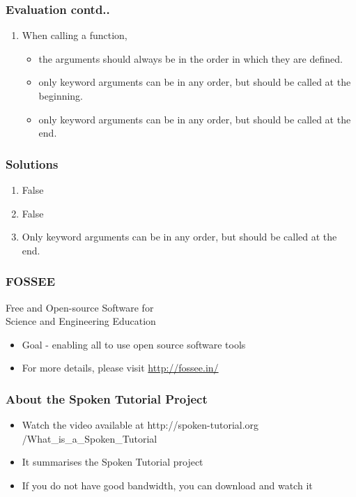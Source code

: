 \documentclass[17pt,compress]{beamer}
\newcounter{saveenumi}
\newcommand{\conti}{\setcounter{enumi}{\value{saveenumi}}}
\begin{document}
\begin{frame}[fragile]
\frametitle{Evaluation contd..}
\label{sec-13.3}

\begin{enumerate}
\conti
\item When calling a function,
\begin{itemize}
\item the arguments should always be in the order in which they are defined.\pause
\item only keyword arguments can be in any order, but should be called
     at the beginning.\pause
\item only keyword arguments can be in any order, but should be called at the end.
\end{itemize}
\end{enumerate}
\end{frame}
\begin{frame}
\frametitle{Solutions}
\label{sec-14}

\begin{enumerate}
\item False\pause
\vspace{12pt}
\item False\pause
\vspace{12pt}
\item Only keyword arguments can be in any order, 
   but should be called at the end.
\end{enumerate}
\end{frame}
\begin{frame}
\frametitle{FOSSEE}
{\color{blue}Free and Open-source Software for \\Science and Engineering Education} \\
\begin{itemize}
\item Goal - enabling all to use open source software tools
\item For more details, please visit {\color{blue}\url{http://fossee.in/}}
\end{itemize}
\end{frame}
\begin{frame}
\frametitle{About the Spoken Tutorial Project}
\begin{itemize}
\item Watch the video available at {\color{blue}http://spoken-tutorial.org /What\_is\_a\_Spoken\_Tutorial}
\item It summarises the Spoken Tutorial project \pause
\item If you do not have good bandwidth, you can download and watch it
\end{itemize}
\end{frame}
\end{document}
